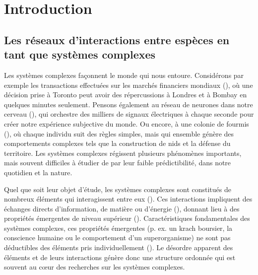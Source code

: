 
\francais   
\doublespacing
\chapter*{Introduction}



\section{Les réseaux d'interactions entre espèces en tant que systèmes complexes}

Les systèmes complexes façonnent le monde qui nous entoure. Considérons par
exemple les transactions effectuées sur les marchés financiers mondiaux
(\cite{Anderson2018Economy}), où une décision prise à Toronto peut avoir des
répercussions à Londres et à Bombay en quelques minutes seulement. Pensons
également au réseau de neurones dans notre cerveau (\cite{Sporns2011Human}), qui
orchestre des milliers de signaux électriques à chaque seconde pour créer notre
expérience subjective du monde. Ou encore, à une colonie de fourmis
(\cite{Bonabeau1999Swarm}), où chaque individu suit des règles simples, mais qui
ensemble génère des comportements complexes tels que la construction de nids et
la défense du territoire. Les systèmes complexes régissent plusieurs phénomènes
importants, mais souvent difficiles à étudier de par leur faible prédictibilité,
dans notre quotidien et la nature. 

Quel que soit leur objet d'étude, les systèmes complexes sont constitués de
nombreux éléments qui interagissent entre eux (\cite{Rind1999Complexity}). Ces
interactions impliquent des échanges directs d'information, de matière ou
d'énergie (\cite{Ladyman2013What}), donnant lieu à des propriétés émergentes de
niveau supérieur (\cite{Foote2007Mathematics}). Caractéristiques fondamentales
des systèmes complexes, ces propriétés émergentes (p. ex. un krach boursier, la
conscience humaine ou le comportement d'un superorganisme) ne sont pas
déductibles des éléments pris individuellement (\cite{Nielsen2000Emergent}). Le
désordre apparent des éléments et de leurs interactions génère donc une
structure ordonnée qui est souvent au cœur des recherches sur les systèmes
complexes. 


